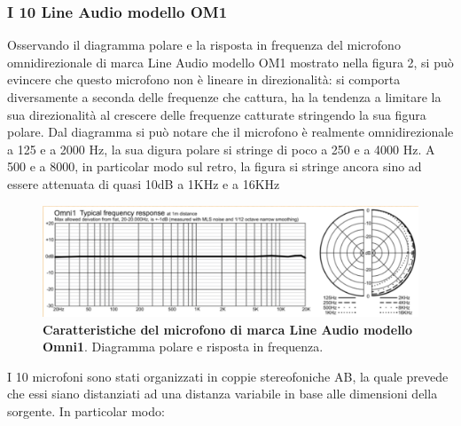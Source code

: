 \subsubsection*{I 10 Line Audio modello OM1}
Osservando il diagramma polare e la risposta in frequenza del microfono omnidirezionale di marca Line Audio modello OM1 mostrato nella figura 2, si può evincere che questo microfono non è lineare in direzionalità: si comporta diversamente a seconda delle frequenze che cattura, ha la tendenza a limitare la sua direzionalità al crescere delle frequenze catturate stringendo la sua figura polare. Dal diagramma si può notare che il microfono è realmente omnidirezionale a 125 e a 2000 Hz, la sua digura polare si stringe di poco a 250 e a 4000 Hz. A 500 e a 8000, in particolar modo sul retro, la figura si stringe ancora sino ad essere attenuata di quasi 10dB a 1KHz e a 16KHz

\begin{figure}[b]
	\begin{center}
		\includegraphics[width=.47\textwidth]{img/image1.png}
		\caption{\textbf{Caratteristiche del microfono di marca Line Audio modello Omni1}. Diagramma polare e risposta in frequenza.}
		\label{gr01}
	\end{center}
\end{figure}

I 10 microfoni sono stati organizzati in coppie stereofoniche AB, la quale prevede che essi siano distanziati ad una distanza variabile in base alle dimensioni della sorgente. In particolar modo:

